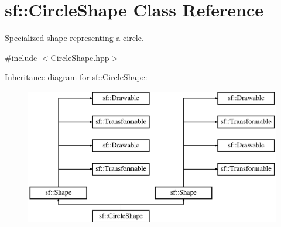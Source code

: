 \hypertarget{classsf_1_1_circle_shape}{\section{sf\-:\-:Circle\-Shape Class Reference}
\label{classsf_1_1_circle_shape}
}


Specialized shape representing a circle.  




{\ttfamily \#include $<$Circle\-Shape.\-hpp$>$}

Inheritance diagram for sf\-:\-:Circle\-Shape\-:\begin{figure}[H]
\begin{center}
\leavevmode
\includegraphics[height=6.000000cm]{classsf_1_1_circle_shape}
\end{center}
\end{figure}
